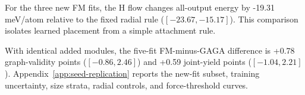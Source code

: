 For the three new FM fits, the H flow changes all-output energy by -19.31 meV/atom relative to the fixed radial rule ($[-23.67,-15.17]$). This comparison isolates learned placement from a simple attachment rule.

With identical added modules, the five-fit FM-minus-GAGA difference is +0.78 graph-validity points ($[-0.86,2.46]$) and +0.59 joint-yield points ($[-1.04,2.21]$). Appendix~\ref{app:seed-replication} reports the new-fit subset, training uncertainty, size strata, radial controls, and force-threshold curves.
